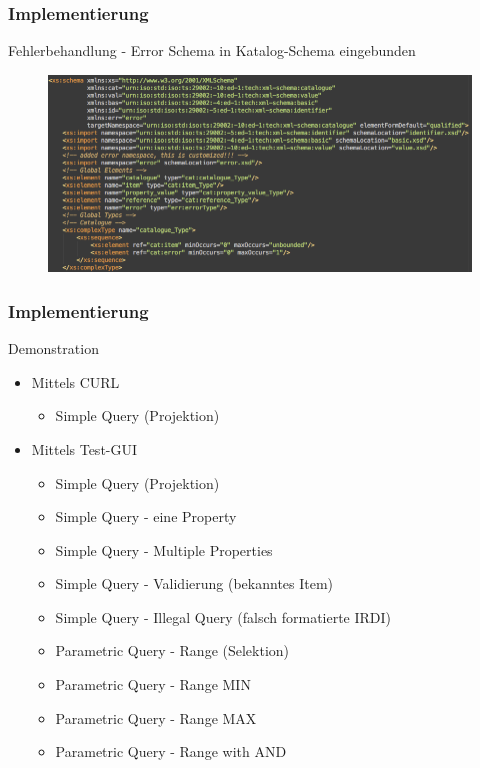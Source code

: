 \documentclass[serif,mathserif]{beamer}
\begin{document}
 \begin{frame}
  \frametitle{Implementierung}
  Fehlerbehandlung - Error Schema in Katalog-Schema eingebunden

     \begin{figure}[t]
     \includegraphics[width=11.5cm]{images/ErrorSchemaCatalogue.png}
     \end{figure}
 \end{frame}

 \begin{frame}
  \frametitle{Implementierung}
  Demonstration
  
     \begin{itemize}
     \item Mittels CURL
          \begin{itemize}
          \item Simple Query (Projektion)
          \end{itemize}
     \item Mittels Test-GUI
          \begin{itemize}
          \item Simple Query (Projektion)
          \item Simple Query - eine Property
          \item Simple Query - Multiple Properties
          \item Simple Query - Validierung (bekanntes Item)
          \item Simple Query - Illegal Query (falsch formatierte IRDI)
          \item Parametric Query - Range (Selektion)
          \item Parametric Query - Range MIN
          \item Parametric Query - Range MAX
          \item Parametric Query - Range with AND
          \end{itemize}                 
     \end{itemize}
 \end{frame}
\end{document}
